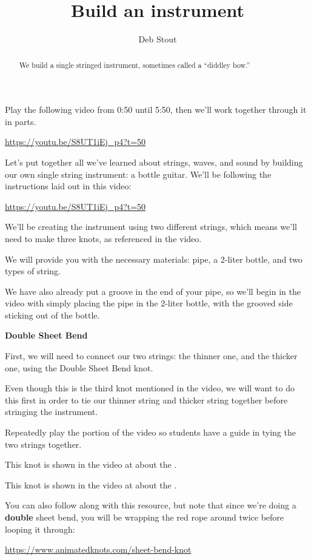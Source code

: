 \documentclass[12pt,noauthor,nooutcomes,instructornotes]{ximera}
\title{Build an instrument}
\author{Deb Stout}
\begin{document}
\begin{abstract}
We build a single stringed instrument, sometimes called a ``diddley bow.''
\end{abstract}
\maketitle


\begin{instructorNotes}
Play the following video from 0:50 until 5:50, then we'll work together through it in parts.  

\url{https://youtu.be/S8UT1iEj_p4?t=50}
\end{instructorNotes}

Let's put together all we've learned about strings, waves, and sound by building our own single string instrument: a bottle guitar.  We'll be following the instructions laid out in this video:

\url{https://youtu.be/S8UT1iEj_p4?t=50} %

We'll be creating the instrument using two different strings, which means we'll need to make three knots, as referenced in the video.

We will provide you with the necessary materials: pipe, a 2-liter bottle, and two types of string.  

We have also already put a groove in the end of your pipe, so we'll begin in the video with simply placing the pipe in the 2-liter bottle, with the grooved side sticking out of the bottle.


\begin{question}
\textbf{Double Sheet Bend}

First, we will need to connect our two strings: the thinner one, and the thicker one, using the Double Sheet Bend knot.

Even though this is the third knot mentioned in the video, we will want to do this first in order to tie our thinner string and thicker string together before stringing the instrument.

\begin{instructorNotes}
Repeatedly play the portion of the video so students have a guide in tying the two strings together.

This knot is shown in the video at about the .
\end{instructorNotes}

This knot is shown in the video at about the .

You can also follow along with this resource, but note that since we're doing a \textbf{double} sheet bend, you will be wrapping the red rope around twice before looping it through:

\url{https://www.animatedknots.com/sheet-bend-knot}
\end{question}
\end{document}
